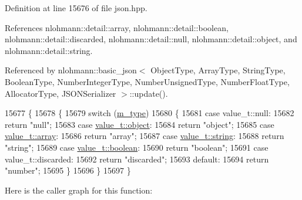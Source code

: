 Definition at line 15676 of file json.\+hpp.



References nlohmann\+::detail\+::array, nlohmann\+::detail\+::boolean, nlohmann\+::detail\+::discarded, nlohmann\+::detail\+::null, nlohmann\+::detail\+::object, and nlohmann\+::detail\+::string.



Referenced by nlohmann\+::basic\+\_\+json$<$ Object\+Type, Array\+Type, String\+Type, Boolean\+Type, Number\+Integer\+Type, Number\+Unsigned\+Type, Number\+Float\+Type, Allocator\+Type, J\+S\+O\+N\+Serializer $>$\+::update().


\begin{DoxyCode}
15677     \{
15678         \{
15679             \textcolor{keywordflow}{switch} (\hyperlink{classnlohmann_1_1basic__json_a91990b60d7d4d67968a2c1db677536e7}{m\_type})
15680             \{
15681                 \textcolor{keywordflow}{case} value\_t::null:
15682                     \textcolor{keywordflow}{return} \textcolor{stringliteral}{"null"};
15683                 \textcolor{keywordflow}{case} \hyperlink{namespacenlohmann_1_1detail_a1ed8fc6239da25abcaf681d30ace4985aa8cfde6331bd59eb2ac96f8911c4b666}{value\_t::object}:
15684                     \textcolor{keywordflow}{return} \textcolor{stringliteral}{"object"};
15685                 \textcolor{keywordflow}{case} \hyperlink{namespacenlohmann_1_1detail_a1ed8fc6239da25abcaf681d30ace4985af1f713c9e000f5d3f280adbd124df4f5}{value\_t::array}:
15686                     \textcolor{keywordflow}{return} \textcolor{stringliteral}{"array"};
15687                 \textcolor{keywordflow}{case} \hyperlink{namespacenlohmann_1_1detail_a1ed8fc6239da25abcaf681d30ace4985ab45cffe084dd3d20d928bee85e7b0f21}{value\_t::string}:
15688                     \textcolor{keywordflow}{return} \textcolor{stringliteral}{"string"};
15689                 \textcolor{keywordflow}{case} \hyperlink{namespacenlohmann_1_1detail_a1ed8fc6239da25abcaf681d30ace4985a84e2c64f38f78ba3ea5c905ab5a2da27}{value\_t::boolean}:
15690                     \textcolor{keywordflow}{return} \textcolor{stringliteral}{"boolean"};
15691                 \textcolor{keywordflow}{case} value\_t::discarded:
15692                     \textcolor{keywordflow}{return} \textcolor{stringliteral}{"discarded"};
15693                 \textcolor{keywordflow}{default}:
15694                     \textcolor{keywordflow}{return} \textcolor{stringliteral}{"number"};
15695             \}
15696         \}
15697     \}
\end{DoxyCode}
Here is the caller graph for this function\+:
\mbox{\label{classnlohmann_1_1basic__json_a74fa3ab2003f2f6f2b69deaafed9126d}} 
